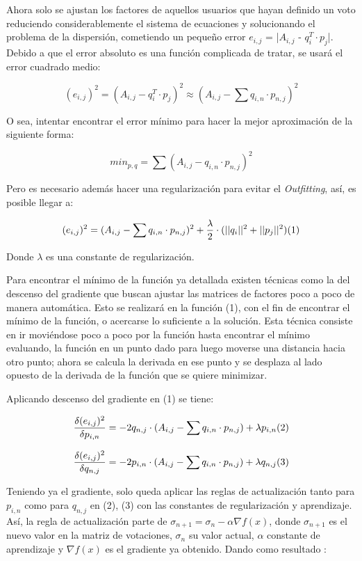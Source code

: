 \documentclass{article}
\begin{document}
Ahora solo se ajustan los factores de 
aquellos usuarios que hayan definido un voto 
reduciendo considerablemente el sistema de 
ecuaciones y solucionando el problema de la 
dispersión, cometiendo un pequeño error $e_{i, j}$ = |$A_{i, j}$ - $q^T_{i} \cdot p_{j}$|. Debido a que el error absoluto es una 
función complicada de tratar, se usará el error 
cuadrado medio:

$$
(e_{i, j})^2 = (A_{i, j} - q^T_{i} \cdot p_{j})^2 \approx (A_{i, j} - \sum q_{i, n}\cdot p_{n, j})^2
$$

O sea, intentar encontrar el error mínimo para hacer la mejor aproximación de la siguiente forma:

$$
min_{p, q} = \sum (A_{i, j} - q_{i, n}\cdot p_{n, j})^2
$$

Pero es necesario además hacer una regularización para evitar el \textit{Outfitting}, así, es posible llegar a:

$$
(e_{i, j})^2 = (A_{i, j} - \sum q_{i, n}\cdot p_{n, j})^2 + \frac{\lambda}{2} \cdot (||q_{i}||^2 + ||p_{j}||^2) \space (1)
$$

Donde $\lambda$ es una constante de regularización.

Para encontrar el mínimo de la función ya detallada 
existen técnicas como la del descenso del gradiente que 
buscan ajustar las matrices de factores poco a 
poco de manera automática. Esto se realizará en la 
función (1), con el fin de encontrar el mínimo de 
la función, o acercarse lo suficiente a la solución. Esta técnica consiste en ir 
moviéndose poco a poco por la función hasta encontrar el mínimo evaluando, la función en un punto dado para 
luego moverse una distancia hacia otro punto; 
ahora se calcula la derivada en ese punto y 
se desplaza al lado opuesto de la derivada de 
la función que se quiere minimizar.

Aplicando descenso del gradiente en (1) se tiene:

$$
\frac{\delta(e_{i, j})^2}{\delta p_{i, n}} = -2q_{n, j}\cdot (A_{i, j} - \sum q_{i, n}\cdot p_{n, j}) + \lambda p_{i, n} \space (2)
$$

$$
\frac{\delta(e_{i, j})^2}{\delta q_{n, j}} = -2p_{i, n}\cdot (A_{i, j} - \sum q_{i, n}\cdot p_{n, j}) + \lambda q_{n, j} \space (3)
$$

Teniendo ya el gradiente, solo queda 
aplicar las reglas de actualización tanto para $p_{i, n}$
como para $q_{n, j}$ en (2), (3) con las constantes de 
regularización y aprendizaje. Así, la regla de 
actualización parte de $\sigma_{n + 1} = \sigma_{n} - \alpha \nabla f(x)$, donde $\sigma_{n + 1}$ es el nuevo valor en la matriz de votaciones, $\sigma_{n}$ su valor actual, $\alpha$ constante de aprendizaje y $\nabla f(x)$ es el gradiente ya obtenido. Dando como resultado :
\end{document}
